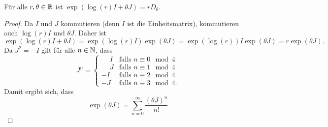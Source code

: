 \documentclass[a4paper,10pt]{scrartcl}
\begin{document}
\begin{lemma}
  Für alle $r, \theta \in \mathbb{R}$ ist $\exp(\log(r) I + \theta J) = r D_{\theta}$.
\end{lemma}
\begin{proof}
  Da $I$ und $J$ kommutieren (denn $I$ ist die Einheitsmatrix), kommutieren auch $\log(r) I$ und $\theta J$.
  Daher ist
  \[
      \exp(\log(r) I + \theta J)
    = \exp(\log(r) I) \exp(\theta J)
    = \exp(\log(r)) I \exp(\theta J)
    = r \exp(\theta J).
  \]
  Da $J^2 = -I$ gilt für alle $n \in \mathbb{N}$, dass
  \[
    J^n
    =
    \begin{cases}
      \phantom{-}I  & \text{falls $n \equiv 0 \mod 4$}  \\
      \phantom{-}J  & \text{falls $n \equiv 1 \mod 4$}  \\
                -I  & \text{falls $n \equiv 2 \mod 4$}  \\
                -J  & \text{falls $n \equiv 3 \mod 4$}.
    \end{cases}
  \]
  Damit ergibt sich, dass
  \[
      \exp(\theta J)
    = \sum_{n=0}^\infty \frac{(\theta J)^n}{n!}
  \]

\end{proof}
\end{document}
